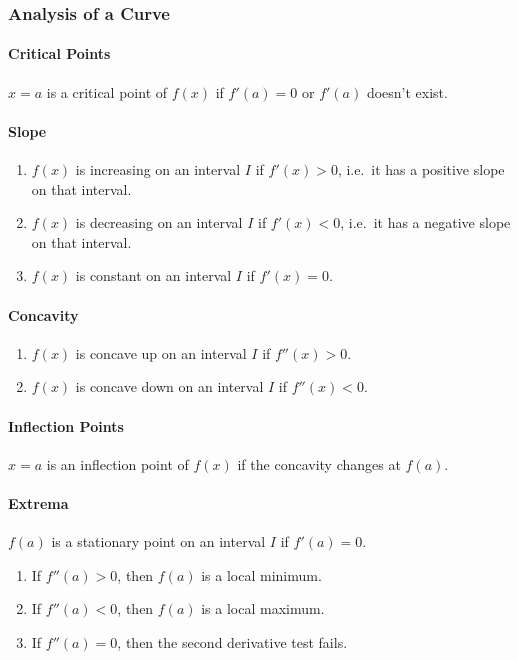 \documentclass[12pt]{article}
\begin{document}
\subsubsection{Analysis of a Curve}
\paragraph{Critical Points}
$x = a$ is a critical point of $ f(x) $ if $ f'(a)=0 $ or $ f'(a) $ doesn't exist.
\paragraph{Slope}
\begin{enumerate}
	\item $ f(x) $ is increasing on an interval $I$ if $f'(x) > 0$, i.e.\ it has a positive slope on that interval.
	\item $f(x)$ is decreasing on an interval $I$ if $f'(x) < 0$, i.e.\ it has a negative slope on that interval. 
	\item $f(x)$ is constant on an interval $I$ if $ f'(x) = 0 $.
\end{enumerate}
\paragraph{Concavity}
\begin{enumerate}
	\item $f(x)$ is concave up on an interval $I$ if $ f''(x) > 0 $.
	\item $f(x)$ is concave down on an interval $I$ if $f''(x) < 0 $.
\end{enumerate}
\paragraph{Inflection Points}
$x = a$ is an inflection point of $f(x)$ if the concavity changes at $f(a)$.
\paragraph{Extrema}
$f(a)$ is a stationary point on an interval $I$ if $f'(a) = 0$.
\begin{enumerate}
	\item If $f''(a) > 0$, then $f(a)$ is a local minimum.
	\item If $f''(a)< 0$, then $f(a)$ is a local maximum.
	\item If $f''(a)= 0$, then the second derivative test fails.
\end{enumerate}
\end{document}

